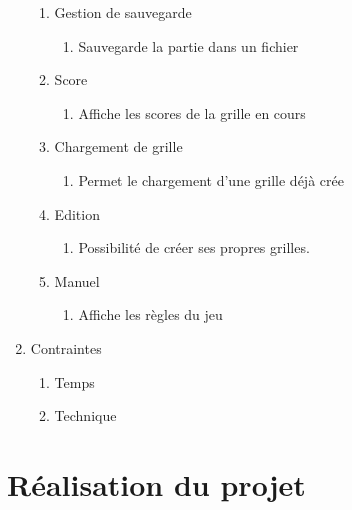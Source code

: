 \documentclass[12pt]{beamer}
\begin{document}
\begin{frame}
\begin{enumerate}
\begin{enumerate}
        \item Gestion de sauvegarde
        \begin{enumerate}
            \item Sauvegarde la partie dans un fichier
        \end{enumerate}\pause
                        
        \item Score
        \begin{enumerate}
            \item Affiche les scores de la grille en cours
        \end{enumerate}\pause
                        
        \item Chargement de grille
        \begin{enumerate}
            \item Permet le chargement d'une grille déjà crée
        \end{enumerate}\pause
                        
        \item Edition
        \begin{enumerate}
            \item Possibilité de créer ses propres grilles.
        \end{enumerate}\pause
                        
        \item Manuel
        \begin{enumerate}
            \item Affiche les règles du jeu
        \end{enumerate}\pause
    \end{enumerate}
    
    
    \item Contraintes 
    \begin{enumerate}
        \item Temps
        \item Technique
    \end{enumerate}
    
    
    \end{enumerate}\pause
\end{frame}


\section{Réalisation du projet}
\end{document}
